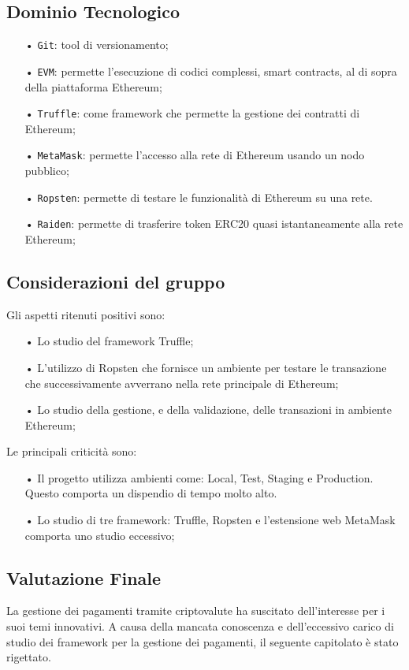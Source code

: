 \subsection{Dominio Tecnologico}
\begin{itemize}

\item[•] \texttt{Git}: tool di versionamento;
\item[•] \texttt{EVM}: permette l’esecuzione di codici complessi, smart contracts, al di sopra della piattaforma Ethereum;
\item[•] \texttt{Truffle}: come framework che permette la gestione dei contratti di Ethereum;
\item[•] \texttt{MetaMask}: 
permette l'accesso alla rete di Ethereum usando un nodo pubblico; 
\item[•] \texttt{Ropsten}: permette di testare le funzionalità di Ethereum su una rete. 
\item[•] \texttt{Raiden}: permette di trasferire token ERC20 quasi istantaneamente alla rete Ethereum;  

\end{itemize}

\subsection{Considerazioni del gruppo}

Gli aspetti ritenuti positivi sono: 
\begin{itemize}

\item[•] Lo studio del framework Truffle;
\item[•] L'utilizzo di Ropsten che fornisce un ambiente per testare le transazione che successivamente avverrano nella rete principale di Ethereum;
\item[•] Lo studio della gestione, e della validazione, delle transazioni in ambiente Ethereum; 

\end{itemize}

Le principali criticità sono: 
\begin{itemize}

\item[•] Il progetto utilizza ambienti come: Local, Test, Staging e Production. Questo comporta un dispendio di tempo molto alto. 

\item[•] Lo studio di tre framework: Truffle, Ropsten e l'estensione web MetaMask comporta uno studio eccessivo;

\end{itemize}


\subsection{Valutazione Finale}
La gestione dei pagamenti tramite criptovalute ha suscitato dell'interesse per i suoi temi innovativi. 
A causa della mancata conoscenza e dell'eccessivo carico di studio dei framework per la gestione dei pagamenti, il seguente capitolato è stato rigettato. 